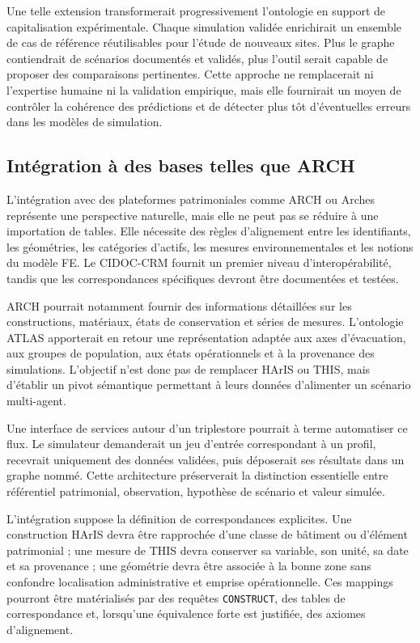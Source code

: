 \documentclass{article}
\begin{document}
Une telle extension transformerait progressivement l'ontologie en support de capitalisation expérimentale. Chaque simulation validée enrichirait un ensemble de cas de référence réutilisables pour l'étude de nouveaux sites. Plus le graphe contiendrait de scénarios documentés et validés, plus l'outil serait capable de proposer des comparaisons pertinentes. Cette approche ne remplacerait ni l'expertise humaine ni la validation empirique, mais elle fournirait un moyen de contrôler la cohérence des prédictions et de détecter plus tôt d'éventuelles erreurs dans les modèles de simulation.

\subsection{Intégration à des bases telles que ARCH}

L'intégration avec des plateformes patrimoniales comme ARCH ou Arches représente une perspective naturelle, mais elle ne peut pas se réduire à une importation de tables. Elle nécessite des règles d'alignement entre les identifiants, les géométries, les catégories d'actifs, les mesures environnementales et les notions du modèle FE. Le CIDOC-CRM fournit un premier niveau d'interopérabilité, tandis que les correspondances spécifiques devront être documentées et testées.

ARCH pourrait notamment fournir des informations détaillées sur les constructions, matériaux, états de conservation et séries de mesures. L'ontologie ATLAS apporterait en retour une représentation adaptée aux axes d'évacuation, aux groupes de population, aux états opérationnels et à la provenance des simulations. L'objectif n'est donc pas de remplacer HArIS ou THIS, mais d'établir un pivot sémantique permettant à leurs données d'alimenter un scénario multi-agent.

Une interface de services autour d'un triplestore pourrait à terme automatiser ce flux. Le simulateur demanderait un jeu d'entrée correspondant à un profil, recevrait uniquement des données validées, puis déposerait ses résultats dans un graphe nommé. Cette architecture préserverait la distinction essentielle entre référentiel patrimonial, observation, hypothèse de scénario et valeur simulée.

L'intégration suppose la définition de correspondances explicites. Une construction HArIS devra être rapprochée d'une classe de bâtiment ou d'élément patrimonial ; une mesure de THIS devra conserver sa variable, son unité, sa date et sa provenance ; une géométrie devra être associée à la bonne zone sans confondre localisation administrative et emprise opérationnelle. Ces mappings pourront être matérialisés par des requêtes \texttt{CONSTRUCT}, des tables de correspondance et, lorsqu'une équivalence forte est justifiée, des axiomes d'alignement.
\end{document}
